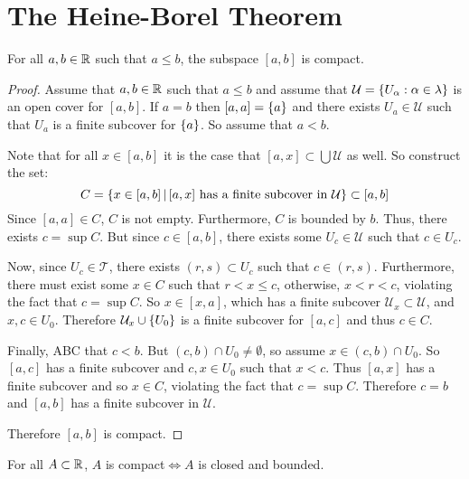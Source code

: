 \documentclass[letterpaper,12pt,fleqn]{article}
\newcommand{\T}{\mathscr{T}}
\newcommand{\U}{\mathcal{U}}
\renewcommand{\a}{\alpha}
\renewcommand{\l}{\lambda}
\begin{document}
\section*{The Heine-Borel Theorem}

\begin{theorem}
  For all \(a,b\in\mathbb{R}\) such that \(a\le b\), the subspace \([a,b]\) is compact.
\end{theorem}

\begin{proof}
  Assume that \(a,b\in\mathbb{R}\) such that \(a\le b\) and assume that \(\U=\set{U_{\a}:\a\in\l}\) is an open cover for
  \([a,b]\).  If \(a=b\) then \([a,a]=\{a\}\) and there exists \(U_a\in\U\) such that \(U_a\) is a finite subcover
  for \(\{a\}\).  So assume that \(a<b\).

  Note that for all \(x\in[a,b]\) it is the case that \([a,x]\subset\bigcup\U\) as well.  So construct the set:
  \[C=\setb{x\in[a,b]}{[a,x]\ \text{has a finite subcover in}\ \U}\subset[a,b]\]
  Since \([a,a]\in C\), \(C\) is not empty.  Furthermore, \(C\) is bounded by \(b\).  Thus, there exists
  \(c=\sup C\).  But since \(c\in[a,b]\), there exists some \(U_c\in\U\) such that \(c\in U_c\).

  Now, since \(U_c\in\T\), there exists \((r,s)\subset U_c\) such that \(c\in(r,s)\).  Furthermore, there must
  exist some \(x\in C\) such that \(r<x\le c\), otherwise, \(x<r<c\), violating the fact that \(c=\sup C\).  So
  \(x\in[x,a]\), which has a finite subcover \(\U_x\subset\U\), and \(x,c\in U_0\).  Therefore \(\U_x\cup\set{U_0}\)
  is a finite subcover for \([a,c]\) and thus \(c\in C\).

  Finally, ABC that \(c<b\).  But \((c,b)\cap U_0\ne\emptyset\), so assume \(x\in(c,b)\cap U_0\).  So \([a,c]\) has
  a finite subcover and \(c,x\in U_0\) such that \(x<c\).  Thus \([a,x]\) has a finite subcover and so \(x\in C\),
  violating the fact that \(c=\sup C\).  Therefore \(c=b\) and \([a,b]\) has a finite subcover in \(\U\).

  Therefore \([a,b]\) is compact.
\end{proof}

\begin{theorem}
  For all \(A\subset\mathbb{R}\), \(A\) is compact\(\iff A\) is closed and bounded.
\end{theorem}
\end{document}
